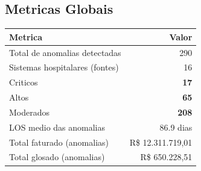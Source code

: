 \documentclass[a4paper,10pt]{article}
\begin{document}
\subsection{Metricas Globais}
\begin{center}
\begin{tabular}{lr}
\toprule
\textbf{Metrica} & \textbf{Valor} \\
\midrule
Total de anomalias detectadas & 290 \\
Sistemas hospitalares (fontes) & 16 \\
Criticos & \textcolor{anomred}{\textbf{17}} \\
Altos & \textcolor{anomorange}{\textbf{65}} \\
Moderados & \textcolor{anomyellow}{\textbf{208}} \\
LOS medio das anomalias & 86.9 dias \\

Total faturado (anomalias) & R\$ 12.311.719,01 \\

Total glosado (anomalias) & \textcolor{anomred}{R\$ 650.228,51} \\

\bottomrule
\end{tabular}
\end{center}
\end{document}
